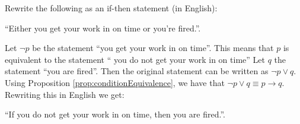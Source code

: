 \guard




\begin{exmp}
\label{exmp:conditionalStatementTranslation}
  Rewrite the following as an if-then statement (in English):
  \begin{center}
    ``Either you get your work in on time or you're fired.''.
  \end{center}

  Let $\neg p$ be the statement ``you get your work in on time''.
  This means that $p$ is equivalent to the statement `` you do not get your work in on time''
  Let $q$ the statement ``you are fired''.
  Then the original statement can be written as $\neg p\vee q$.
  Using Proposition \ref{prop:conditionEquivalence}, we have that $\neg p\vee q \equiv p\rightarrow q$.
  Rewriting this in English we get:
  \begin{center}
    ``If you do not get your work in on time, then you are fired.''.
  \end{center}
\end{exmp}
